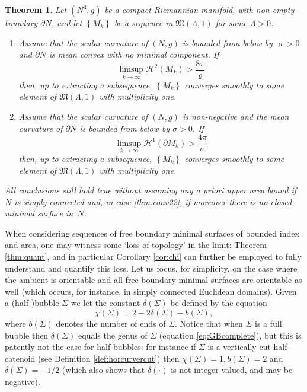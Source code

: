 \documentclass[10pt]{amsart}
\newcounter{cas}
\newtheorem{thm}{Theorem}
\theoremstyle{definition}
\newcommand{\h}{\mathscr{H}}
\begin{document}
\begin{thm}\label{thm:conv2}
Let $(N^3,g)$ be a compact Riemannian manifold, with non-empty boundary $\partial N$, and let $\left\{M_k\right\}$ be a sequence in $\mathfrak{M}(\Lambda,1)$ for some $\Lambda>0$.
\begin{enumerate}
\item \label{thm:conv21}
Assume that the scalar curvature of $(N,g)$ is bounded from below by $\varrho>0$ and $\partial N$ is mean convex with no minimal component. If
\[
\limsup_{k\to\infty}\h^2(M_k)>\frac{8\pi}{\varrho}
\]
then, up to extracting a subsequence, $\left\{M_k\right\}$ converges smoothly to some element of $\mathfrak{M}(\Lambda,1)$ with multiplicity one.
\item \label{thm:conv22}
Assume that the scalar curvature of $(N,g)$ is non-negative and the mean curvature of $\partial N$ is bounded from below by $\sigma>0$. If
\[
\limsup_{k\to\infty}\h^1(\partial M_k)>\frac{4\pi}{\sigma}
\]
then, up to extracting a subsequence, $\left\{M_k\right\}$ converges smoothly to some element of $\mathfrak{M}(\Lambda,1)$ with multiplicity one.
\end{enumerate}
All conclusions still hold true without assuming any a priori upper area bound if $N$ is simply connected and, in case \eqref{thm:conv22}, if moreover there is no \emph{closed} minimal surface in~$N$.
\end{thm}

When considering sequences of free boundary minimal surfaces of bounded index and area, one may witness some `loss of topology' in the limit: Theorem \ref{thm:quant}, and in particular Corollary \ref{cor:chi} can further be employed to fully understand and quantify this loss. Let us focus, for simplicity, on the case where the ambient is orientable and all free boundary minimal surfaces are orientable as well (which occurs, for instance, in simply connected Euclidean domains).
Given a (half-)bubble $\Sigma$ we let the constant $\delta(\Sigma)$ be defined by the equation
\[
\chi(\Sigma)=2-2 \delta(\Sigma)-b(\Sigma),
\]
where $b(\Sigma)$ denotes the number of ends of $\Sigma$. Notice that when $\Sigma$ is a full bubble then $\delta(\Sigma)$ equals the genus of $\Sigma$ (\cf equation \eqref{eq:GBcomplete}), but this is patently not the case for half-bubbles: for instance if $\Sigma$ is a vertically cut half-catenoid (see Definition \ref{def:horcurvercut}) then $\chi(\Sigma)=1, b(\Sigma)=2$ and $\delta(\Sigma)=-1/2$ (which also shows that $\delta(\cdot)$ is not integer-valued, and may be negative).
\end{document}
